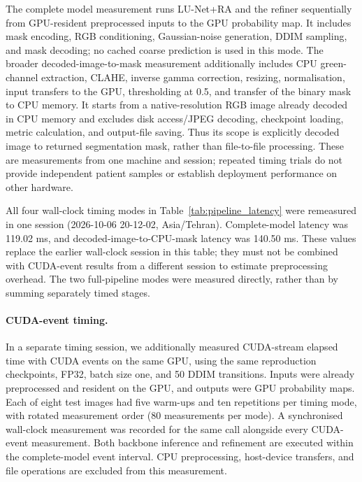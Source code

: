 \documentclass[jimaging,article,submit,pdftex,moreauthors]{Definitions/mdpi}%
\begin{document}
The complete model measurement runs LU-Net+RA and the refiner sequentially from GPU-resident preprocessed inputs to the GPU probability map. It includes mask encoding, RGB conditioning, Gaussian-noise generation, DDIM sampling, and mask decoding; no cached coarse prediction is used in this mode. The broader decoded-image-to-mask measurement additionally includes CPU green-channel extraction, CLAHE, inverse gamma correction, resizing, normalisation, input transfers to the GPU, thresholding at 0.5, and transfer of the binary mask to CPU memory. It starts from a native-resolution RGB image already decoded in CPU memory and excludes disk access/JPEG decoding, checkpoint loading, metric calculation, and output-file saving. Thus its scope is explicitly decoded image to returned segmentation mask, rather than file-to-file processing. These are measurements from one machine and session; repeated timing trials do not provide independent patient samples or establish deployment performance on other hardware.





All four wall-clock timing modes in Table~\ref{tab:pipeline_latency} were remeasured in one session (2026-10-06 20-12-02, Asia/Tehran). Complete-model latency was 119.02 ms, and decoded-image-to-CPU-mask latency was 140.50 ms. These values replace the earlier wall-clock session in this table; they must not be combined with CUDA-event results from a different session to estimate preprocessing overhead. The two full-pipeline modes were measured directly, rather than by summing separately timed stages.



\paragraph{CUDA-event timing.}

In a separate timing session, we additionally measured CUDA-stream elapsed time with CUDA events on the same GPU, using the same reproduction checkpoints, FP32, batch size one, and 50 DDIM transitions. Inputs were already preprocessed and resident on the GPU, and outputs were GPU probability maps. Each of eight test images had five warm-ups and ten repetitions per timing mode, with rotated measurement order (80 measurements per mode). A synchronised wall-clock measurement was recorded for the same call alongside every CUDA-event measurement. Both backbone inference and refinement are executed within the complete-model event interval. CPU preprocessing, host-device transfers, and file operations are excluded from this measurement.
\end{document}
